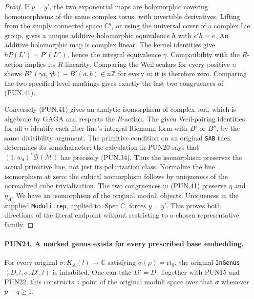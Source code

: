 \documentclass[11pt,a4paper]{article}
\numberwithin{equation}{section}
\theoremstyle{remark}\newtheorem{remark}[theorem]{Remark}
\begin{document}
\begin{proof}
If \(y=y'\), the two exponential maps are holomorphic covering
homomorphisms of the same complex torus, with invertible
derivatives.  Lifting from the simply connected space
\(\mathbb C^g\), or using the universal cover of a complex
Lie group, gives a unique additive holomorphic equivalence
\(h\) with \(e'h=e\).  An additive holomorphic map is
complex linear.  The kernel identities give
\(hP(L')=P'(L'')\), hence the integral equivalence
\(\gamma\).  Compatibility with the \(R\)-action implies
its \(R\)-linearity.  Comparing the Weil scalars for every
positive \(n\) shows
\(B''(\gamma a,\gamma b)-B'(a,b)\in n\mathbb Z\) for every
\(n\); it is therefore zero.  Comparing the two specified
level markings gives exactly the last two congruences of
(PUN.41).

Conversely (PUN.41) gives an analytic isomorphism of complex
tori, which is algebraic by GAGA and respects the \(R\)-action.
The given Weil-pairing identities for all \(n\) identify each
fiber line's integral Riemann form with \(B'\) or \(B''\),
by the same divisibility argument.  The primitive condition
on an original \texttt{SAB} then determines its semicharacter:
the calculation in PUN20 says that
\((1,w_0)^*\mathcal B(\mathcal M)\) has precisely (PUN.34).
Thus the isomorphism preserves the actual primitive line,
not just its polarization class.  Normalize the line
isomorphism at zero; the cubical isomorphism follows by
uniqueness of the normalized cube trivialization.  The two
congruences in (PUN.41) preserve \(\eta\) and \(\eta_A\).
We have an isomorphism of the original moduli objects.
Uniqueness in the supplied \texttt{Moduli.\allowbreak rep}, applied to
\(\operatorname{Spec}\mathbb C\), forces \(y=y'\).
This proves both directions of the literal endpoint without
restricting to a chosen representative family.
\end{proof}

\paragraph{PUN24. A marked genus exists for every prescribed base embedding.}
\label{claim:PUN24}
For every original \(\sigma:K_A(l)\to\mathbb C\) satisfying
\(\sigma(\rho)=\mathrm{rt}_0\), the original
\texttt{In\allowbreak Genus}\((D,l,\sigma,D',t)\) is inhabited.
One can take \(D'=D\).  Together with PUN15 and PUN22, this
constructs a point of the original moduli space over that
\(\sigma\) whenever \(p+q\ge1\).
\end{document}
